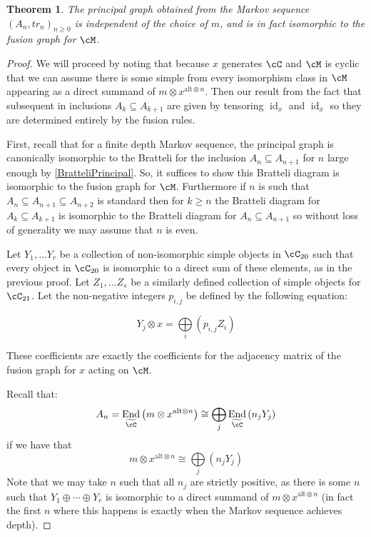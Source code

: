 \documentclass[11pt]{article}
\theoremstyle{plain}
\newtheorem{thm}{Theorem}[section]
\theoremstyle{definition}
\DeclareMathOperator{\End}{End}
\DeclareMathOperator{\id}{id}
\newcommand{\xalt}{x^{\text{alt}\otimes n}}
\begin{document}
\begin{thm}
The principal graph obtained from the Markov sequence $\left(A_n, tr_n\right)_{n\geq 0}$ is independent of the choice of $m$, and is in fact isomorphic to the fusion graph for $\cM$.
\end{thm}

\begin{proof}
We will proceed by noting that because $x$ generates $\cC$ and $\cM$ is cyclic that we can assume there is some simple from every isomorphism class in $\cM$ appearing as a direct summand of $m\otimes \xalt $. Then our result from the fact that subsequent in inclusions $A_k\subseteq A_{k+1}$ are given by tensoring $\id_x$ and $\id_{\overline{x}}$ so they are determined entirely by the fusion rules.

First, recall that for a finite depth Markov sequence, the principal graph is canonically isomorphic to the Bratteli for the inclusion $A_n\subseteq A_{n+1}$ for $n$ large enough by \ref{BratteliPrincipal}. So, it suffices to show this Bratteli diagram is isomorphic to the fusion graph for $\cM$. Furthermore if $n$ is such that $A_n\subseteq A_{n+1}\subseteq A_{n+2}$ is standard then for $k\geq n$ the Bratteli diagram for $A_{k}\subseteq A_{k+1}$ is isomorphic to the Bratteli diagram for $A_n\subseteq A_{n+1}$ so without loss of generality we may assume that $n$ is even.

Let $Y_1,\ldots Y_{r}$ be a collection of non-isomorphic simple objects in $\cC_{20}$ such that every object in $\cC_{20}$ is isomorphic to a direct sum of these elements, as in the previous proof. Let $Z_{1},\ldots Z_{s}$ be a similarly defined collection of simple objects for $\cC_{21}$. 
	Let the non-negative integers $p_{i,j}$ be defined by the following equation:

$$Y_j\otimes x=\bigoplus\limits_{i}\left(p_{i,j}Z_i\right)$$

These coefficients are exactly the coefficients for the adjacency matrix of the fusion graph for $x$ acting on $\cM$.

Recall that:
$$A_n=\End_{\widetilde{\cC}}\left(m\otimes\xalt\right)\cong \bigoplus\limits_{j}\End_{\widetilde{\cC}}\left(n_j Y_j\right)$$
if we have that 
$$m \otimes \xalt \cong \bigoplus\limits_{j}\left(n_jY_j\right)$$
Note that we may take $n$ such that all $n_j$ are strictly positive, as there is some $n$ such that $Y_1\oplus\cdots \oplus Y_{r}$ is isomorphic to a direct summand of $m\otimes \xalt$ (in fact the first $n$ where this happens is exactly when the Markov sequence achieves depth). 


\end{proof}
\end{document}

